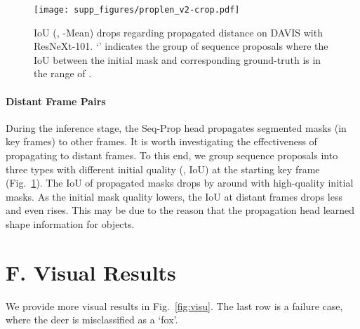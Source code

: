 \documentclass[10pt,twocolumn,letterpaper]{article}
\begin{document}
	\begin{figure}[h]
		\begin{center}
\texttt{[image: supp\_figures/proplen\_v2-crop.pdf]}
		\end{center}
		\vspace{-0.15in}
		\caption{IoU (\ie, -Mean) drops regarding propagated distance on DAVIS with ResNeXt-101. 
			`' indicates the group of sequence proposals where the IoU between the initial mask and corresponding ground-truth is in the range of .
		}
		\label{fig:abl_proplen}
		\vspace{-0.2in}
	\end{figure}
	
	\paragraph{Distant Frame Pairs}
	During the inference stage, the Seq-Prop head propagates segmented masks (in key frames) to other frames. It is worth investigating the effectiveness of propagating to distant frames.
	To this end, we group sequence proposals into three types with different initial quality (\ie, IoU) at the starting key frame (Fig.~\ref{fig:abl_proplen}).
	The IoU of propagated masks drops by around  with high-quality initial masks. 
	As the initial mask quality lowers, the IoU at distant frames drops less and even rises. This may be due to the reason that the propagation head learned shape information for objects.

	
	\vspace{-0.07in}
	\section*{F. Visual Results} \label{sec:visu}
	\vspace{-0.05in}
	We provide more visual results in Fig.~\ref{fig:visu}. The last row is a failure case, where the deer is misclassified as a `fox'.
	
\end{document}
